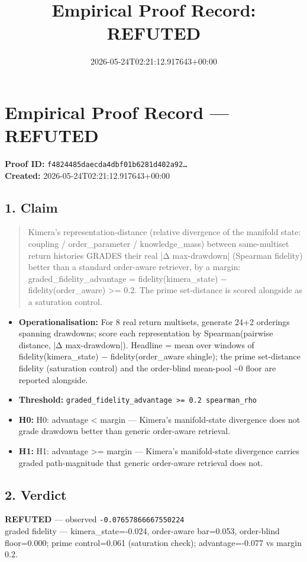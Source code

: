 \documentclass{article}
\title{Empirical Proof Record: REFUTED}
\date{2026-05-24T02:21:12.917643+00:00}
\begin{document}
\maketitle
\section*{Empirical Proof Record --- \textcolor{refuted}{\textbf{REFUTED}}}
\textbf{Proof ID:} \texttt{f4824485daecda4dbf01b6281d402a92\dots}\\
\textbf{Created:} 2026-05-24T02:21:12.917643+00:00
\subsection*{1. Claim}
\begin{quote}Kimera's representation-distance (relative divergence of the manifold state: coupling / order\_parameter / knowledge\_mass) between same-multiset return histories GRADES their real |Δ max-drawdown| (Spearman fidelity) better than a standard order-aware retriever, by a margin: graded\_fidelity\_advantage = fidelity(kimera\_state) − fidelity(order\_aware) >= 0.2. The prime set-distance is scored alongside as a saturation control.\end{quote}
\begin{itemize}
\item \textbf{Operationalisation:} For 8 real return multisets, generate 24+2 orderings spanning drawdowns; score each representation by Spearman(pairwise distance, |Δ max-drawdown|). Headline = mean over windows of fidelity(kimera\_state) − fidelity(order\_aware shingle); the prime set-distance fidelity (saturation control) and the order-blind mean-pool \textasciitilde{}0 floor are reported alongside.
\item \textbf{Threshold:} \texttt{graded\_fidelity\_advantage >= 0.2 spearman\_rho}
\item \textbf{H0:} H0: advantage < margin — Kimera's manifold-state divergence does not grade drawdown better than generic order-aware retrieval.
\item \textbf{H1:} H1: advantage >= margin — Kimera's manifold-state divergence carries graded path-magnitude that generic order-aware retrieval does not.
\end{itemize}
\subsection*{2. Verdict}
\textcolor{refuted}{\textbf{REFUTED}} --- observed \texttt{-0.07657866667550224}\\
graded fidelity — kimera\_state=-0.024, order-aware bar=0.053, order-blind floor=0.000; prime control=0.061 (saturation check); advantage=-0.077 vs margin 0.2.
\end{document}
